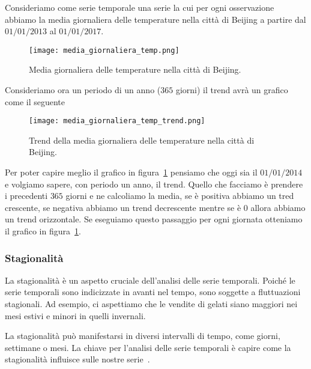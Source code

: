 \begin{esempio} 
    Consideriamo come serie temporale una serie la cui per ogni osservazione abbiamo
    la media giornaliera delle temperature nella città di Beijing a partire 
    dal $01/01/2013$ al $01/01/2017$.

    \begin{figure}[H]
        \centering
        \texttt{[image: media\_giornaliera\_temp.png]}
        \caption{Media giornaliera delle temperature nella città di Beijing.}
    \end{figure}

    Consideriamo ora un periodo di un anno ($365$ giorni) il trend avrà un grafico
    come il seguente

    \begin{figure}[H]
        \centering
        \texttt{[image: media\_giornaliera\_temp\_trend.png]}
        \caption{Trend della media giornaliera delle temperature nella città di Beijing.}
        \label{fig:media_giornaliera_temp_trend}
    \end{figure}
    Per poter capire meglio il grafico in figura~\ref*{fig:media_giornaliera_temp_trend} 
    pensiamo che oggi sia il $01/01/2014$ e volgiamo sapere, con periodo un anno,
    il trend. Quello che facciamo è prendere i precedenti $365$ giorni e ne calcoliamo 
    la media, se è positiva abbiamo un tred crescente, se negativa abbiamo un trend decrescente
    mentre se è $0$ allora abbiamo un trend orizzontale. Se eseguiamo questo passaggio
    per ogni giornata otteniamo il grafico in figura~\ref*{fig:media_giornaliera_temp_trend}.

\end{esempio}


\subsubsection{Stagionalità}
La stagionalità è un aspetto cruciale dell'analisi delle serie temporali. 
Poiché le serie temporali sono indicizzate in avanti nel tempo, sono soggette a 
fluttuazioni stagionali. Ad esempio, ci aspettiamo che le vendite di gelati siano 
maggiori nei mesi estivi e minori in quelli invernali.

La stagionalità può manifestarsi in diversi intervalli di tempo, 
come giorni, settimane o mesi. La chiave per l'analisi delle serie temporali 
è capire come la stagionalità influisce sulle nostre serie~\cite{md:seasonality}.

